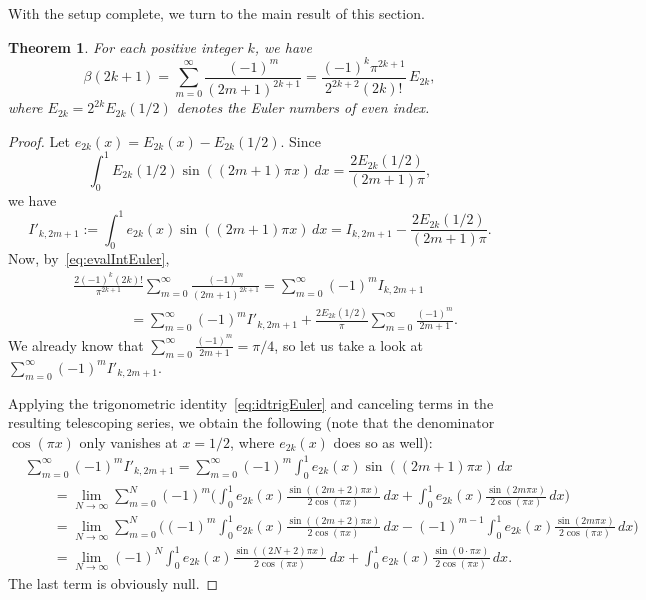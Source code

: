 \documentclass[11pt, oneside]{article}
\theoremstyle{plain}
\newtheorem{theorem}{Theorem}
\theoremstyle{definition}
\begin{document}
With the setup complete, we turn to the main result of this section. 

\begin{theorem}
\label{teo:beta2k+1}
For each positive integer $k$, we have
\begin{equation}
\label{eq:beta2k+1}
  \beta(2k+1) = \sum_{m=0}^\infty \frac{(-1)^m}{(2m+1)^{2k+1}} 
  = \frac{(-1)^{k} \pi^{2k+1}}{2^{2k+2} (2k)!} \,E_{2k},
\end{equation}
where $E_{2k} = 2^{2k}E_{2k}(1/2)$ denotes the Euler numbers of even index.
\end{theorem}

\begin{proof}
Let $e_{2k}(x) = E_{2k}(x)-E_{2k}(1/2)$. Since
\[
  \int_0^1 E_{2k}(1/2) \sin((2m+1)\pi x) \,dx = \frac{2E_{2k}(1/2)}{(2m+1)\pi},
\]
we have
\[
  I'_{k,2m+1} := \int_0^1 e_{2k}(x)\sin((2m+1)\pi x)\,dx 
  = I_{k,2m+1} - \frac{2E_{2k}(1/2)}{(2m+1)\pi}.
\]
Now, by~\eqref{eq:evalIntEuler},
\begin{align*}
  & \frac{2(-1)^{k}(2k)!}{\pi^{2k+1}} \sum_{m=0}^{\infty} \frac{(-1)^m}{(2m+1)^{2k+1}} 
  = \sum_{m=0}^{\infty} (-1)^m I_{k,2m+1} \\
  &\qquad\qquad
  = \sum_{m=0}^{\infty} (-1)^m I'_{k,2m+1} + \frac{2E_{2k}(1/2)}{\pi} \sum_{m=0}^{\infty} \frac{(-1)^m}{2m+1}.
\end{align*}
We already know that $\sum_{m=0}^{\infty} \frac{(-1)^m}{2m+1} = \pi/4$, so let us take a look at $\sum_{m=0}^{\infty} (-1)^m I'_{k,2m+1}$.

Applying the trigonometric identity~\eqref{eq:idtrigEuler} and canceling terms in the resulting telescoping series, we obtain the following (note that the denominator $\cos(\pi x)$ only vanishes at $x=1/2$, where $e_{2k}(x)$ does so as well):
\begin{align*}
  &\sum_{m=0}^{\infty} (-1)^m I'_{k,2m+1} 
  = \sum_{m=0}^{\infty} (-1)^m \int_0^{1} e_{2k}(x) \sin((2m+1)\pi x)\,dx \\
  &\qquad= \lim_{N \to \infty} \sum_{m=0}^{N} (-1)^m \Bigg( 
    \int_0^{1} e_{2k}(x) \frac{\sin((2m+2)\pi x)}{2\cos(\pi x)}\,dx
    + \int_0^{1} e_{2k}(x) \frac{\sin(2m\pi x)}{2\cos(\pi x)}\,dx \Bigg) \\
  &\qquad= \lim_{N \to \infty} \sum_{m=0}^{N} \Bigg(
    (-1)^{m} \int_0^{1} e_{2k}(x) \frac{\sin((2m+2)\pi x)}{2\cos(\pi x)}\,dx
    - (-1)^{m-1} \int_0^{1} e_{2k}(x) \frac{\sin(2m\pi x)}{2\cos(\pi x)}\,dx \Bigg) \\
  &\qquad= \lim_{N \to \infty} (-1)^N \int_0^{1} e_{2k}(x) \frac{\sin((2N+2)\pi x)}{2\cos(\pi x)}\,dx
    + \int_0^{1} e_{2k}(x) \frac{\sin(0 \cdot \pi x)}{2\cos(\pi x)}\,dx.
\end{align*}
The last term is obviously null.


\end{proof}
\end{document}

